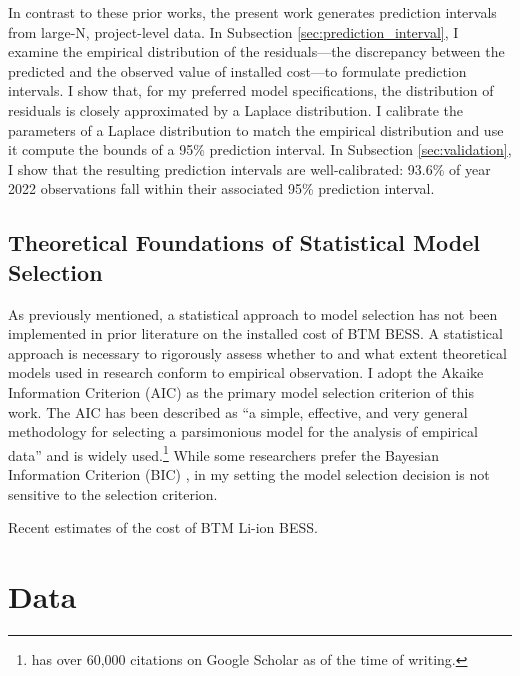\documentclass[preprint,12pt,authoryear]{elsarticle}
\begin{document}
In contrast to these prior works, the present work generates prediction intervals from large-N, project-level data. In Subsection \ref{sec:prediction_interval}, I examine the empirical distribution of the residuals---the discrepancy between the predicted and the observed value of installed cost---to formulate prediction intervals. I show that, for my preferred model specifications, the distribution of residuals is closely approximated by a Laplace distribution. I calibrate the parameters of a Laplace distribution to match the empirical distribution and use it compute the bounds of a 95\% prediction interval. In Subsection \ref{sec:validation}, I show that the resulting prediction intervals are well-calibrated: 93.6\% of year 2022 observations fall within their associated 95\% prediction interval.

\subsection{Theoretical Foundations of Statistical Model Selection}

As previously mentioned, a statistical approach to model selection has not been implemented in prior literature on the installed cost of BTM BESS. A statistical approach is necessary to rigorously assess whether to and what extent theoretical models used in research conform to empirical observation. I adopt the Akaike Information Criterion (AIC) \citep{akaike1974} as the primary model selection criterion of this work. The AIC has been described as ``a simple, effective, and very general methodology for selecting a parsimonious model for the analysis of empirical data'' \citep[p. 32]{burnhamanderson1998} and is widely used.\footnote{\cite{akaike1974} has over 60,000 citations on Google Scholar as of the time of writing.} While some researchers prefer the Bayesian Information Criterion (BIC) \citep{burnham2004}, in my setting the model selection decision is not sensitive to the selection criterion.

\begin{landscape}
\begin{table}[h]

\caption{Recent estimates of the cost of BTM Li-ion BESS.}\label{tab:cost_est_BTM}
\end{table}
\end{landscape}


\section{Data}\label{sec:data}
\end{document}
